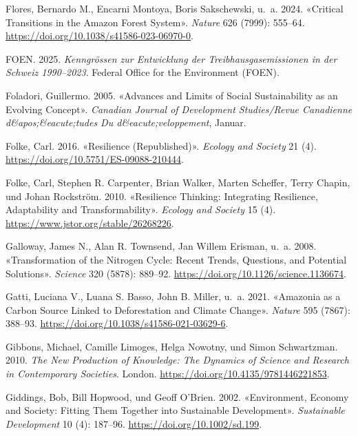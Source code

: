\documentclass[
  nswissgerman,
  a4paper,
  openany]{book}
\newlength{\cslhangindent}
\newenvironment{CSLReferences}[2] %
 {\begin{list}{}{%
  \setlength{\itemindent}{0pt}
  \setlength{\leftmargin}{0pt}
  \setlength{\parsep}{0pt}
  \ifodd #1
   \setlength{\leftmargin}{\cslhangindent}
   \setlength{\itemindent}{-1\cslhangindent}
  \fi
  \setlength{\itemsep}{#2\baselineskip}}}
 {\end{list}}
\begin{document}
\begin{CSLReferences}{1}{1}
{Flores, Bernardo M., Encarni Montoya, Boris Sakschewski, u.~a.} 2024.
{«Critical Transitions in the {Amazon} Forest System»}. \emph{Nature}
626 (7999): 555--64. \url{https://doi.org/10.1038/s41586-023-06970-0}.

FOEN. 2025. \emph{{Kenngrössen zur Entwicklung der
Treibhausgasemissionen in der Schweiz 1990--2023}}. Federal Office for
the Environment (FOEN).

Foladori, Guillermo. 2005. {«Advances and {Limits} of {Social
Sustainability} as an {Evolving Concept}»}. \emph{Canadian Journal of
Development Studies/Revue Canadienne d\&apos;\&eacute;tudes Du
d\&eacute;veloppement}, Januar.

Folke, Carl. 2016. {«Resilience ({Republished})»}. \emph{Ecology and
Society} 21 (4). \url{https://doi.org/10.5751/ES-09088-210444}.

Folke, Carl, Stephen R. Carpenter, Brian Walker, Marten Scheffer, Terry
Chapin, und Johan Rockström. 2010. {«Resilience {Thinking}:
{Integrating} {Resilience}, {Adaptability} and {Transformability}»}.
\emph{Ecology and Society} 15 (4).
\url{https://www.jstor.org/stable/26268226}.

Galloway, James N., Alan R. Townsend, Jan Willem Erisman, u.~a. 2008.
{«Transformation of the {Nitrogen Cycle}: {Recent Trends}, {Questions},
and {Potential Solutions}»}. \emph{Science} 320 (5878): 889--92.
\url{https://doi.org/10.1126/science.1136674}.

Gatti, Luciana V., Luana S. Basso, John B. Miller, u.~a. 2021.
{«Amazonia as a Carbon Source Linked to Deforestation and Climate
Change»}. \emph{Nature} 595 (7867): 388--93.
\url{https://doi.org/10.1038/s41586-021-03629-6}.

Gibbons, Michael, Camille Limoges, Helga Nowotny, und Simon Schwartzman.
2010. \emph{The {New} {Production} of {Knowledge}: {The} {Dynamics} of
{Science} and {Research} in {Contemporary} {Societies}}. London.
\url{https://doi.org/10.4135/9781446221853}.

Giddings, Bob, Bill Hopwood, und Geoff O'Brien. 2002. {«Environment,
Economy and Society: Fitting Them Together into Sustainable
Development»}. \emph{Sustainable Development} 10 (4): 187--96.
\url{https://doi.org/10.1002/sd.199}.


\end{CSLReferences}
\end{document}

